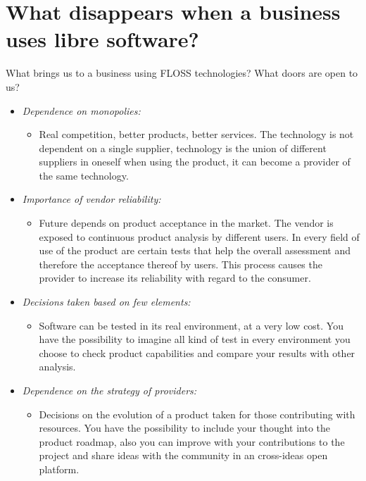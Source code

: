 \section{What disappears when a business uses libre software?}

What brings us to a business using FLOSS technologies? What doors are open to us?

\begin{itemize}
    \item \emph{Dependence on monopolies:}
    \begin{itemize}
        \item Real competition, better products, better services. The technology is not dependent on a single supplier, technology is the union of different suppliers in oneself when using the product, it can become a provider of the same technology.
    \end{itemize}  
    \item \emph{Importance of vendor reliability:}
    \begin{itemize}
        \item Future depends on product acceptance in the market. The vendor is exposed to continuous product analysis by different users. In every field of use of the product are certain tests that help the overall assessment and therefore the acceptance thereof by users. This process causes the provider to increase its reliability with regard to the consumer.
    \end{itemize}  
    \item \emph{Decisions taken based on few elements:}
    \begin{itemize}
        \item Software can be tested in its real environment, at a very low cost. You have the possibility to imagine all kind of test in every environment you choose to check product capabilities and compare your results with other analysis.
    \end{itemize}  
    \item \emph{Dependence on the strategy of providers:}
    \begin{itemize}
        \item Decisions on the evolution of a product taken for those contributing with resources. You have the possibility to include your thought into the product roadmap, also you can improve with your contributions to the project and share ideas with the community in an cross-ideas open platform.
    \end{itemize}  

\end{itemize}
